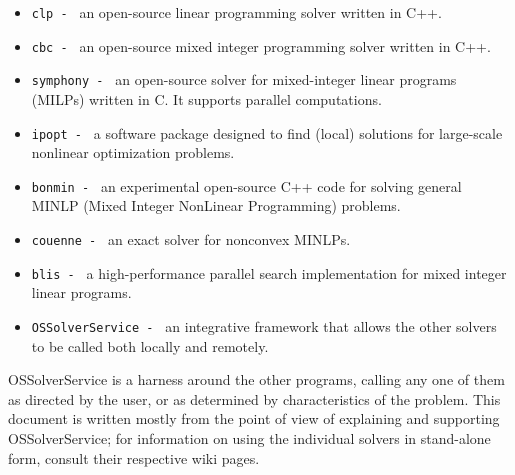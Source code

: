 \begin{itemize}
\item{\tt clp - } an open-source linear programming solver \ifuselibs written in C++\fi.

\item{\tt cbc - } an open-source mixed integer programming solver \ifuselibs written in C++\fi.

\item{\tt symphony - } an open-source solver for mixed-integer linear programs (MILPs) \ifuselibs written in C\fi. It supports parallel computations.

\item{\tt ipopt - } a software package designed to find (local) solutions for large-scale ​nonlinear optimization problems.

\item{\tt bonmin - } an experimental open-source C++ code for solving general MINLP (Mixed Integer NonLinear Programming) problems.

\item{\tt couenne - } an exact solver for nonconvex MINLPs.

\item{\tt blis - } a high-performance parallel search implementation for mixed integer linear programs.

\item{\tt OSSolverService - } an integrative framework that allows the other solvers to be called both locally and remotely.

\end{itemize}

OSSolverService is a harness around the other programs, calling any one of them as directed by the user, or as determined by characteristics of the problem.
This document is written mostly from the point of view of explaining and supporting OSSolverService; for information on using the individual solvers in stand-alone form, consult their respective wiki pages.


